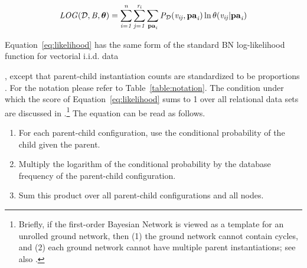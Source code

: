 {{	%
	
	\begin{equation} \label{eq:likelihood}
		\it{LOG}(\mathcal{D},B,\boldsymbol{\theta}) =   \sum_{i=1}^{n}\sum_{j=1}^{r_{i}} \sum_{\mathbf{pa}_{i}}P_{\mathcal{D}}(v_{ij},\mathbf{pa}_{i})\ln \theta(v_{ij}|\mathbf{pa}_{i})  
	\end{equation}
	
	
	Equation~\eqref{eq:likelihood} has the same form of the standard BN log-likelihood function for vectorial i.i.d. data~\citep{Campos2006}}, except that parent-child instantiation counts are standardized to be proportions \citep{Schulte2011,Schulte2017a}. For the notation please refer to Table~\ref{table:notation}. The condition under which the score of Equation~\eqref{eq:likelihood} sums to 1 over all relational data sets are discussed in \citep{Schulte2011}.\footnote{Briefly, if the first-order Bayesian Network is viewed as a template for an unrolled ground network, then (1) the ground network cannot contain cycles, and (2) each ground network cannot have multiple parent instantiations; see also \citep{Heckerman+al:SRL07}.}  The equation can be read as follows.
	
	\begin{enumerate}
		\item For each parent-child configuration, 
		use the conditional probability of the child given the parent.
		\item Multiply the logarithm of the conditional probability by the database frequency of the parent-child configuration. 
		\item Sum this product over all parent-child configurations and all nodes. 
	\end{enumerate}
	
	
}

